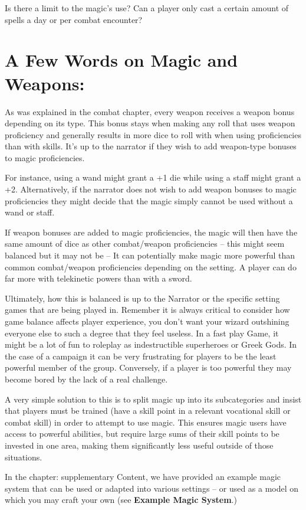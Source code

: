 Is there a limit to the magic’s use? Can a player only cast a certain amount of spells a day or per combat encounter?

\section{A Few Words on Magic and Weapons:}

As was explained in the combat chapter, every weapon receives a weapon bonus depending on its type. This bonus stays when making any roll that uses weapon proficiency and generally results in more dice to roll with when using proficiencies than with skills. It’s up to the narrator if they wish to add weapon-type bonuses to magic proficiencies.

For instance, using a wand might grant a +1 die while using a staff might grant a +2. Alternatively, if the narrator does not wish to add weapon bonuses to magic proficiencies they might decide that the magic simply cannot be used without a wand or staff.

If weapon bonuses are added to magic proficiencies, the magic will then have the same amount of dice as other combat/weapon proficiencies – this might seem balanced but it may not be – It can potentially make magic more powerful than common combat/weapon proficiencies depending on the setting. A player can do far more with telekinetic powers than with a sword.

Ultimately, how this is balanced is up to the Narrator or the specific setting games that are being played in. Remember it is always critical to consider how game balance affects player experience, you don’t want your wizard outshining everyone else to such a degree that they feel useless. In a fast play Game, it might be a lot of fun to roleplay as indestructible superheroes or Greek Gods. In the case of a campaign it can be very frustrating for players to be the least powerful member of the group. Conversely, if a player is too powerful they may become bored by the lack of a real challenge.

A very simple solution to this is to split magic up into its subcategories and insist that players must be trained (have a skill point in a relevant vocational skill or combat skill) in order to attempt to use magic. This ensures magic users have access to powerful abilities, but require large sums of their skill points to be invested in one area, making them significantly less useful outside of those situations.

In the chapter: supplementary Content, we have provided an example magic system that can be used or adapted into various settings – or used as a model on which you may craft your own (see \textbf{Example Magic System}.)